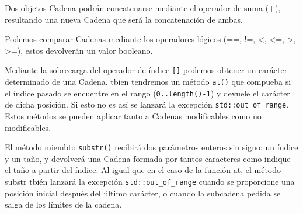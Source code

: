 Dos objetos Cadena podrán concatenarse mediante el operador de suma (+), 
resultando una nueva Cadena que será la concatenación de ambas.

Podemos comparar Cadenas mediante los operadores lógicos (==, !=, \textless, \textless=, 
\textgreater, \textgreater=), estos devolverán un valor booleano.

Mediante la sobrecarga del operador de índice \texttt{[]} podemos obtener un carácter determinado de una Cadena.
tbien tendremos un método \texttt{at()} que compueba si el índice pasado se encuentre en el rango (\texttt{0..length()-1}) y 
devuele el carácter de dicha posición.
Si esto no es así se lanzará la excepción \texttt{std::out\_of\_range}.
Estos métodos se pueden aplicar tanto a Cadenas modificables como no modificables.

El método miembto \texttt{substr()} recibirá dos parámetros enteros sin signo: un índice y
un taño, y devolverá una Cadena formada por tantos caracteres como indique 
el taño a partir del índice.
Al igual que en el caso de la función at, el método substr tbién lanzará la excepción
\texttt{std::out\_of\_range} cuando se proporcione una posición inicial después del 
último carácter, o cuando la subcadena pedida se salga de los límites de la cadena.

